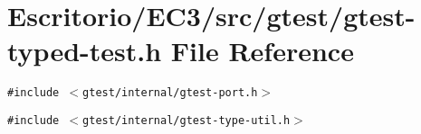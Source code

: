 \section{Escritorio/EC3/src/gtest/gtest-typed-test.h File Reference}
\label{gtest-typed-test_8h}
{\tt \#include $<$gtest/internal/gtest-port.h$>$}\par
{\tt \#include $<$gtest/internal/gtest-type-util.h$>$}\par
